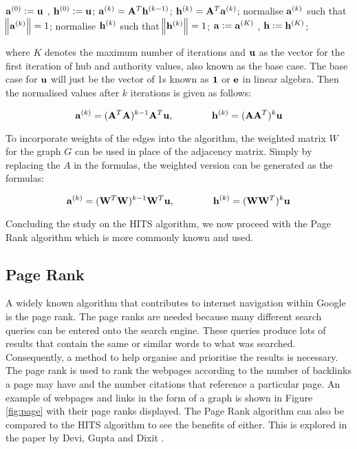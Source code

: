 \begin{algorithmic}
\State $\bold{a}^{(0)} := \bold{u}$ ,   $\bold{h}^{(0)} := \bold{u}$;
   		 \State \qquad $\bold{a}^{(k)} = \bold{A}^{T}\bold{h}^{(k-1)}$;
		 \State \qquad $\bold{h}^{(k)} = \bold{A}^{T}\bold{a}^{(k)}$;
		 \State \qquad normalise $\bold{a}^{(k)}$ such that $\norm{\bold{a}^{(k)}} = 1$;
		 \State \qquad normalise $\bold{h}^{(k)}$ such that $\norm{\bold{h}^{(k)}} = 1$;
\EndFor 
\State $\bold{a} := \bold{a}^{(K)}$ ,   $\bold{h} := \bold{h}^{(K)}$;
\newline
\end{algorithmic}

where $K$ denotes the maximum number of iterations and $\bold{u}$ as the vector for the first iteration of hub and authority values, also known as the base case. The base case for $\bold{u}$ will just be the vector of 1s known as $\bold{1}$ or $\bold{e}$ in linear algebra. Then the normalised values after $k$ iterations is given as follows:

\begin{equation} \label{eq:nhits}
\bold{a}^{(k)} = (\bold{A}^{T}\bold{A})^{k-1}\bold{A}^{T}\bold{u} , \qquad \qquad \bold{h}^{(k)} = (\bold{A}\bold{A}^{T})^{k}\bold{u}
\end{equation}

To incorporate weights of the edges into the algorithm, the weighted matrix $W$ for the graph $G$ can be used in place of the adjacency matrix. Simply by replacing the $A$ in the formulas, the weighted version can be generated as the formulas:

\begin{equation} \label{eq:nhits}
\bold{a}^{(k)} = (\bold{W}^{T}\bold{W})^{k-1}\bold{W}^{T}\bold{u} , \qquad \qquad \bold{h}^{(k)} = (\bold{W}\bold{W}^{T})^{k}\bold{u}
\end{equation}

Concluding the study on the HITS algorithm, we now proceed with the Page Rank algorithm which is more commonly known and used.

\subsection{Page Rank}
A widely known algorithm that contributes to internet navigation within Google is the page rank. The page ranks are needed because many different search queries can be entered onto the search engine. These queries produce lots of results that contain the same or similar words to what was searched. Consequently, a method to help organise and prioritise the results is necessary. The page rank is used to rank the webpages according to the number of backlinks a page may have and the number citations that reference a particular page. An example of webpages and links in the form of a graph is shown in Figure \ref{fig:page} with their page ranks displayed. The Page Rank algorithm can also be compared to the HITS algorithm to see the benefits of either. This is explored in the paper by Devi, Gupta and Dixit \cite{devi2014comparative}.

